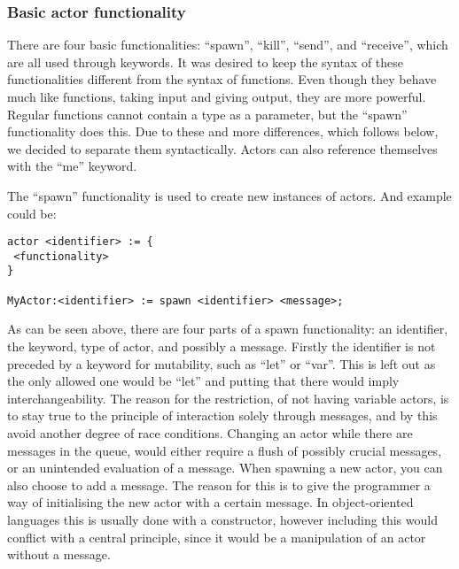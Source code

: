 \subsubsection{Basic actor functionality}

There are four basic functionalities: \enquote{spawn}, \enquote{kill}, \enquote{send}, and \enquote{receive}, which are all used through keywords. It was desired to keep the syntax of these functionalities different from the syntax of functions. Even though they behave much like functions, taking input and giving output, they are more powerful. Regular functions cannot contain a type as a parameter, but the \enquote{spawn} functionality does this. Due to these and more differences, which follows below, we decided to separate them syntactically. Actors can also reference themselves with the \enquote{me} keyword.

The \enquote{spawn} functionality is used to create new instances of actors. And example could be:

\label{actorfuncSpawn}
\begin{lstlisting}
actor <identifier> := {
 <functionality>
}

MyActor:<identifier> := spawn <identifier> <message>;
\end{lstlisting}

As can be seen above, there are four parts of a spawn functionality: an identifier, the keyword, type of actor, and possibly a message. Firstly the identifier is not preceded by a keyword for mutability, such as \enquote{let} or \enquote{var}. This is left out as the only allowed one would be \enquote{let} and putting that there would imply interchangeability. The reason for the restriction, of not having variable actors, is to stay true to the principle of interaction solely through messages, and by this avoid another degree of race conditions. Changing an actor while there are messages in the queue, would either require a flush of possibly crucial messages, or an unintended evaluation of a message. When spawning a new actor, you can also choose to add a message. The reason for this is to give the programmer a way of initialising the new actor with a certain message. In object-oriented languages this is usually done with a constructor, however including this would conflict with a central principle, since it would be a manipulation of an actor without a message.


